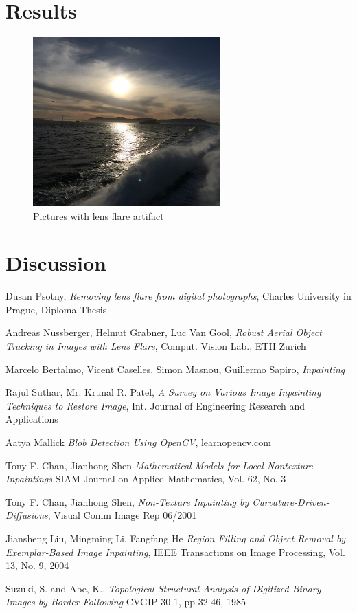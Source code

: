 \documentclass[11pt,twocolumn]{article}
\begin{document}
\section{Results}


\begin{figure}[ht!]
\centering
\includegraphics[width=72mm]{../Matlab/Images/1.jpg}
\caption{Pictures with lens flare artifact}
\end{figure}

\section{Discussion}


\begin{thebibliography}{1}

\bibitem
Dusan Psotny,
\emph{Removing lens flare from digital photographs},
Charles University in Prague, Diploma Thesis

\bibitem
Andreas Nussberger, Helmut Grabner, Luc Van Gool,
\emph{Robust Aerial Object Tracking in Images with Lens Flare},
Comput. Vision Lab., ETH Zurich

\bibitem
Marcelo Bertalmo, Vicent Caselles, Simon Masnou, Guillermo Sapiro,
\emph{Inpainting}

\bibitem
Rajul Suthar, Mr. Krunal R. Patel,
\emph{A Survey on Various Image Inpainting Techniques to Restore Image},
Int. Journal of Engineering Research and Applications

\bibitem
Aatya Mallick
\emph{Blob Detection Using OpenCV},
learnopencv.com

\bibitem
Tony F. Chan, Jianhong Shen
\emph{Mathematical Models for Local Nontexture Inpaintings}
SIAM Journal on Applied Mathematics, Vol. 62, No. 3

\bibitem
Tony F. Chan, Jianhong Shen,
\emph{Non-Texture Inpainting by Curvature-Driven-Diffusions},
Visual Comm Image Rep 06/2001

\bibitem
Jiansheng Liu, Mingming Li, Fangfang He
\emph{Region Filling and Object Removal by Exemplar-Based Image Inpainting},
IEEE Transactions on Image Processing, Vol. 13, No. 9, 2004

\bibitem
Suzuki, S. and Abe, K., 
\emph{Topological Structural Analysis of Digitized Binary Images by Border Following}
CVGIP 30 1, pp 32-46, 1985

\end{thebibliography}
\end{document}
